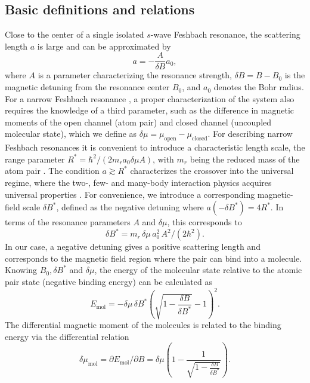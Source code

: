\subsection{Basic definitions and relations}\label{SubSec:BasicDefinition}

Close to the center of a single isolated $s$-wave Feshbach resonance, the scattering length $a$ is large and can be approximated by
\begin{equation}
	a= - \frac{A}{\delta B} a_0 ,
\end{equation}
where $A$ is a parameter characterizing the resonance strength, $\delta B = B-B_0$ is the magnetic detuning from the resonance center $B_0$, and $a_0$ denotes the Bohr radius.
For a narrow Feshbach resonance \cite{Chin2010fri}, a proper characterization of the system also requires the knowledge of a third parameter, such as the difference in magnetic moments of the open channel (atom pair) and closed channel (uncoupled molecular state), which we define as $\delta\mu=\mu_{\mathrm{open}}-\mu_\mathrm{closed}$.
For describing narrow Feshbach resonances it is convenient to introduce a characteristic length scale, the range parameter $R^*=\hbar^2/(2m_ra_0\delta\mu A)$, with $m_r$ being the reduced mass of the atom pair \cite{Petrov2004tbp}. The condition $a\gtrsim R^*$ characterizes the crossover into the universal regime, where the two-, few- and many-body interaction physics acquires universal properties \cite{Chin2010fri, Braaten2006uif, Bloch2008mbp}. 
For convenience, we introduce a corresponding magnetic-field scale $\delta B^*$, defined as the negative detuning where $a(-\delta B^*)=4R^*$. In terms of the resonance parameters $A$ and $\delta\mu$, this corresponds to
\begin{equation}
	\delta B^* =m_r\,\delta\mu\,a_0^2\,A^2/(2\hbar^2).
\end{equation}
In our case, a negative detuning gives a positive scattering length and corresponds to the magnetic field region where the pair can bind into a molecule. Knowing $B_0, \delta B^*$ and $\delta\mu$, the energy of the molecular state relative to the atomic pair state (negative binding energy)  can be calculated as \cite{Lous2018pti, Petrov2004tbp}
\begin{equation}\label{Eq:BindingEnergy}
	E_{\mathrm{mol}}=-\delta\mu\,\delta B^*\left(\sqrt{1-\frac{\delta B}{\delta B^*}}-1 \right)^2.
\end{equation}
The differential magnetic moment of the molecules is related to the binding energy via the differential relation
\begin{equation}\label{Eq:MagneticMoment}
	\delta\mu_{\mathrm{mol}}=\partial E_{\mathrm{mol}}/\partial B=\delta\mu\left(1-\frac{1}{\sqrt{1-\frac{\delta B}{\delta B^*}}}\right).
\end{equation}

